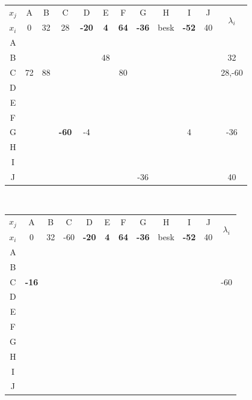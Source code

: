 \documentclass[12pt]{article}
\begin{document}
\begin{enumerate}
\begin{center}
\begin{tabular}{|c|c|c|c|c|c|c|c|c|c|c|c|}
\hline
$x_j$ & A & B & C & D & E & F & G & H & I & J & \multirow{2}{*}{$\lambda_i$} \\ \cline{1-11}
$x_i$ & 0 & 32 & 28 & \textbf{-20} & \textbf{4} & \textbf{64} & \textbf{-36} & besk & \textbf{-52} & 40 &  \\ \hline
A &  &  &  &  &  &  &  &  &  &  &  \\ \hline
B &  &  &  &  & 48 &  &  &  &  &  & 32 \\ \hline
C & 72 & 88 &  &  &  & 80 &  &  &  &  & 28,-60 \\ \hline
D &  & \textbf{} &  &  &  &  &  &  &  &  &  \\ \hline
E &  &  &  &  &  &  &  &  &  & \textbf{} &  \\ \hline
F &  &  &  &  &  &  &  &  &  &  &  \\ \hline
G &  &  & \textbf{-60} & -4 &  &  &  &  & 4 &  & -36 \\ \hline
H &  &  &  &  &  &  &  &  &  &  &  \\ \hline
I &  &  &  &  &  &  &  &  &  &  &  \\ \hline
J &  &  &  &  &  &  & -36 &  &  &  & 40 \\ \hline
\end{tabular}\\
\vspace{0.3cm}
\begin{tabular}{|c|c|c|c|c|c|c|c|c|c|c|c|}
\hline
$x_j$ & A & B & C & D & E & F & G & H & I & J & \multirow{2}{*}{$\lambda_i$} \\ \cline{1-11}
$x_i$ & 0 & 32 & -60 & \textbf{-20} & \textbf{4} & \textbf{64} & \textbf{-36} & besk & \textbf{-52} & 40 &  \\ \hline
A &  &  &  &  &  &  &  &  &  &  &  \\ \hline
B &  &  &  &  &  &  &  &  &  &  &  \\ \hline
C & \textbf{-16} &  &  &  &  &  &  &  &  &  & -60 \\ \hline
D &  & \textbf{} &  &  &  &  &  &  &  &  &  \\ \hline
E &  &  &  &  &  &  &  &  &  & \textbf{} &  \\ \hline
F &  &  &  &  &  &  &  &  &  &  &  \\ \hline
G &  &  & \textbf{} &  &  &  &  &  &  &  &  \\ \hline
H &  &  &  &  &  &  &  &  &  &  &  \\ \hline
I &  &  &  &  &  &  &  &  &  &  &  \\ \hline
J &  &  &  &  &  &  &  &  &  &  &  \\ \hline
\end{tabular}
\\
\vspace{0.3cm}


\end{center}
\end{enumerate}
\end{document}
